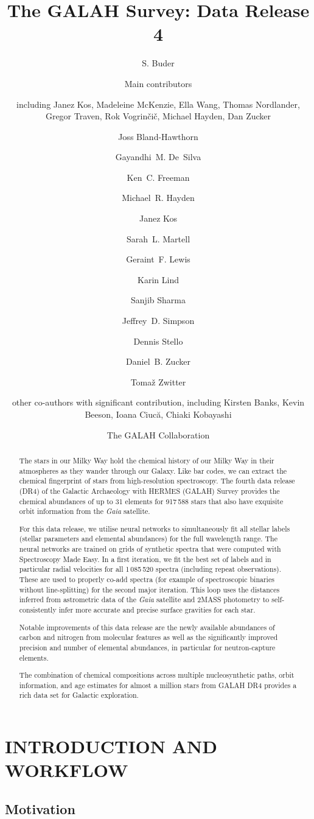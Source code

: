 \documentclass[
  journal=pasa,
  manuscript=research-paper, %
  year=2023,
  volume=37
]{cup-journal}
\title{The GALAH Survey: Data Release 4}
\author{S. Buder}
\affiliation{Research School of Astronomy and Astrophysics, Australian National University, Canberra, ACT 2611, Australia}
\author{Main contributors}
\affiliation{To Be Decided.}
\author{including Janez Kos, Madeleine McKenzie, Ella Wang, Thomas Nordlander, Gregor Traven, Rok Vogrin{\v{c}}i{\v{c}}, Michael Hayden, Dan Zucker}
\author{Joss Bland-Hawthorn}
\author{Gayandhi~M. De~Silva}
\author{Ken~C. Freeman}
\author{Michael~R. Hayden}
\author{Janez Kos}
\author{Sarah~L. Martell}
\author{Geraint~F. Lewis}
\author{Karin Lind}
\author{Sanjib Sharma}
\author{Jeffrey~D. Simpson}
\author{Dennis Stello}
\author{Daniel~B. Zucker}
\author{Toma\v{z} Zwitter}
\author{other co-authors with significant contribution, including Kirsten Banks, Kevin Beeson, Ioana Ciuc{\u{a}}, Chiaki Kobayashi}
\author{The GALAH Collaboration}
\newcommand{\Gaia}{\textit{Gaia}\xspace}
\begin{document}
\begin{abstract}

The stars in our Milky Way hold the chemical history of our Milky Way in their atmospheres as they wander through our Galaxy. Like bar codes, we can extract the chemical fingerprint of stars from high-resolution spectroscopy. The fourth data release (DR4) of the Galactic Archaeology with HERMES (GALAH) Survey provides the chemical abundances of up to 31 elements for 917\,588 stars that also have exquisite orbit information from the \Gaia satellite.

For this data release, we utilise neural networks to simultaneously fit all stellar labels (stellar parameters and elemental abundances) for the full wavelength range. The neural networks are trained on grids of synthetic spectra that were computed with Spectroscopy Made Easy. In a first iteration, we fit the best set of labels and in particular radial velocities for all 1\,085\,520 spectra (including repeat observations). These are used to properly co-add spectra (for example of spectroscopic binaries without line-splitting) for the second major iteration. This loop uses the distances inferred from astrometric data of the \Gaia satellite and 2MASS photometry to self-consistently infer more accurate and precise surface gravities for each star.

Notable improvements of this data release are the newly available abundances of carbon and nitrogen from molecular features as well as the significantly improved precision and number of elemental abundances, in particular for neutron-capture elements.

The combination of chemical compositions across multiple nucleosynthetic paths, orbit information, and age estimates for almost a million stars from GALAH DR4 provides a rich data set for Galactic exploration.

\end{abstract}

\section{INTRODUCTION AND WORKFLOW}
\label{sec:introduction}

\subsection{Motivation} \label{sec:motivation}
\end{document}
